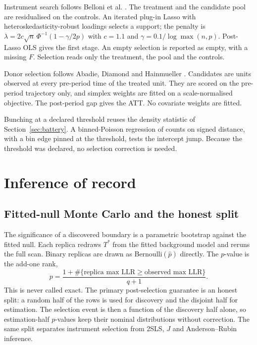 \documentclass[11pt]{article}
\begin{document}
Instrument search follows Belloni et al. \cite{belloni2012}. The treatment and the
candidate pool are residualised on the controls. An iterated plug-in Lasso with
heteroskedasticity-robust loadings selects a support; the penalty is
$\lambda = 2c\sqrt{n}\,\Phi^{-1}(1 - \gamma/2p)$ with $c = 1.1$ and
$\gamma = 0.1/\log\max(n,p)$. Post-Lasso OLS gives the first stage. An empty selection
is reported as empty, with a missing $F$. Selection reads only the treatment, the pool
and the controls.

Donor selection follows Abadie, Diamond and Hainmueller \cite{abadie2010}. Candidates
are units observed at every pre-period time of the treated unit. They are scored on the
pre-period trajectory only, and simplex weights are fitted on a scale-normalised
objective. The post-period gap gives the ATT. No covariate weights are fitted.

Bunching at a declared threshold reuses the density statistic of
Section~\ref{sec:battery}. A binned-Poisson regression of counts on signed distance, with
a bin edge pinned at the threshold, tests the intercept jump. Because the threshold
was declared, no selection correction is needed.

\section{Inference of record}\label{sec:inference}

\subsection{Fitted-null Monte Carlo and the honest split}\label{sec:mc}

The significance of a discovered boundary is a parametric bootstrap against the fitted
null. Each replica redraws $T^\ast$ from the fitted background model and reruns the full
scan. Binary replicas are drawn as Bernoulli$(\hat p)$ directly. The $p$-value is the
add-one rank,
\begin{equation}
p = \frac{1 + \#\{\text{replica max LLR} \ge \text{observed max LLR}\}}{q + 1}.
\end{equation}
This is never called exact. The primary post-selection guarantee is an honest split: a
random half of the rows is used for discovery and the disjoint half for estimation. The
selection event is then a function of the discovery half alone, so estimation-half
$p$-values keep their nominal distributions without correction. The same split
separates instrument selection from 2SLS, $J$ and Anderson--Rubin inference.
\end{document}
